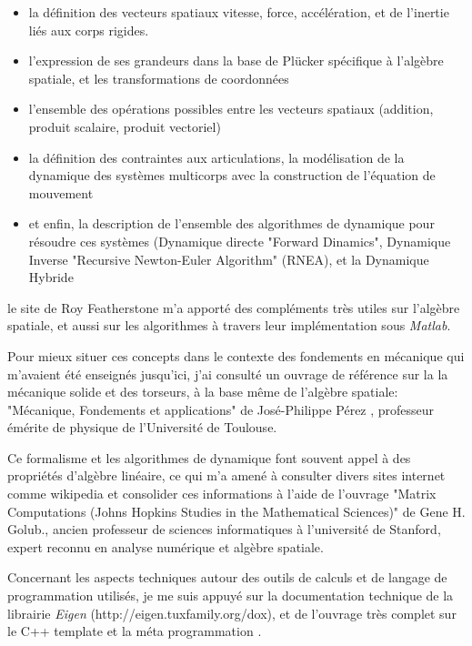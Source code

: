 \documentclass{report}
\begin{document}
\begin{itemize}
\item la définition des vecteurs spatiaux vitesse, force, accélération, et de l'inertie liés aux corps rigides.
\item l'expression de ses grandeurs dans la base de Plücker spécifique à l'algèbre spatiale, et les transformations de coordonnées
\item l'ensemble des opérations possibles entre les vecteurs spatiaux (addition, produit scalaire, produit vectoriel)
\item la définition des contraintes aux articulations, la modélisation de la dynamique des systèmes multicorps avec la construction de l'équation de mouvement
\item et enfin, la description de l'ensemble des algorithmes de dynamique pour résoudre ces systèmes (Dynamique directe "Forward Dinamics", Dynamique Inverse "Recursive Newton-Euler Algorithm" (RNEA), et la Dynamique Hybride
\end{itemize}

\noindent
le site de Roy Featherstone \cite{bib_featherstoneSite} m'a apporté des compléments très utiles sur l'algèbre spatiale, et aussi sur les algorithmes à travers leur implémentation sous \emph{Matlab}.

Pour mieux situer ces concepts dans le contexte des fondements en mécanique qui m'avaient été enseignés jusqu'ici, j'ai consulté un ouvrage de référence sur la la mécanique solide et des torseurs, à la base même de l'algèbre spatiale: "Mécanique, Fondements et applications" de José-Philippe Pérez \cite{bib_champVecteurs}, professeur émérite de physique de l’Université de Toulouse.

Ce formalisme et les algorithmes de dynamique font souvent appel à des propriétés d'algèbre linéaire, ce qui m'a amené à consulter divers sites internet comme wikipedia et consolider ces informations à l'aide de l'ouvrage "Matrix Computations (Johns Hopkins Studies in the Mathematical Sciences)" de Gene H. Golub., ancien professeur de sciences informatiques à l'université de Stanford, expert reconnu en analyse numérique et algèbre spatiale.

Concernant les aspects techniques autour des outils de calculs et de langage de programmation utilisés, je me suis appuyé sur la documentation technique de la librairie \emph{Eigen} (http://eigen.tuxfamily.org/dox), et de l'ouvrage très complet sur le C++ template et la méta programmation \cite{bib_metaprogramming}.
\end{document}
